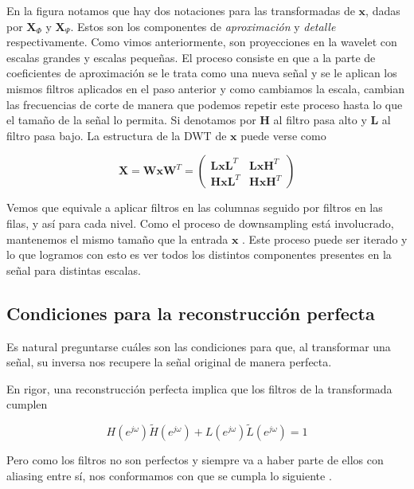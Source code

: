 \documentclass[conference]{IEEEtran}
\begin{document}
En la figura notamos que hay dos notaciones para las transformadas de $\pmb{x}$, dadas por $\pmb{X}_\Phi$ y $\pmb{X}_\Psi$. Estos son los componentes de \emph{aproximación} y \emph{detalle} respectivamente. Como vimos anteriormente, son proyecciones en la wavelet con escalas grandes y escalas pequeñas. El proceso consiste en que a la parte de coeficientes de aproximación se le trata como una nueva señal y se le aplican los mismos filtros aplicados en el paso anterior y como cambiamos la escala, cambian las frecuencias de corte de manera que podemos repetir este proceso hasta lo que el tamaño de la señal lo permita. Si denotamos por $\pmb{H}$ al filtro pasa alto y $\pmb{L}$ al filtro pasa bajo. La estructura de la DWT de $\pmb{x}$ puede verse como


\begin{equation}
    \pmb{X} = \pmb{W}\pmb{x}\pmb{W}^T =
    \begin{pmatrix}
        \pmb{L}\pmb{x}\pmb{L}^T & \pmb{L}\pmb{x}\pmb{H}^T \\
        \pmb{H}\pmb{x}\pmb{L}^T & \pmb{H}\pmb{x}\pmb{H}^T
    \end{pmatrix}
\end{equation}


Vemos que equivale a aplicar filtros en las columnas seguido por filtros en las filas, y así para cada nivel. Como el proceso de downsampling está involucrado, mantenemos el mismo tamaño que la entrada $\pmb{x}$ \cite{dwt}. Este proceso puede ser iterado y lo que logramos con esto es ver todos los distintos componentes presentes en la señal para distintas escalas.

\subsection{Condiciones para la reconstrucción perfecta}

Es natural preguntarse cuáles son las condiciones para que, al transformar una señal, su inversa nos recupere la señal original de manera perfecta.

En rigor, una reconstrucción perfecta implica que los filtros de la transformada cumplen

\begin{equation}
    H(e^{j\omega})\tilde{H}(e^{j\omega}) + L(e^{j\omega})\tilde{L}(e^{j\omega}) = 1
\end{equation}

Pero como los filtros no son perfectos y siempre va a haber parte de ellos con aliasing entre sí, nos conformamos con que se cumpla lo siguiente \cite{dwt}. 
\end{document}
